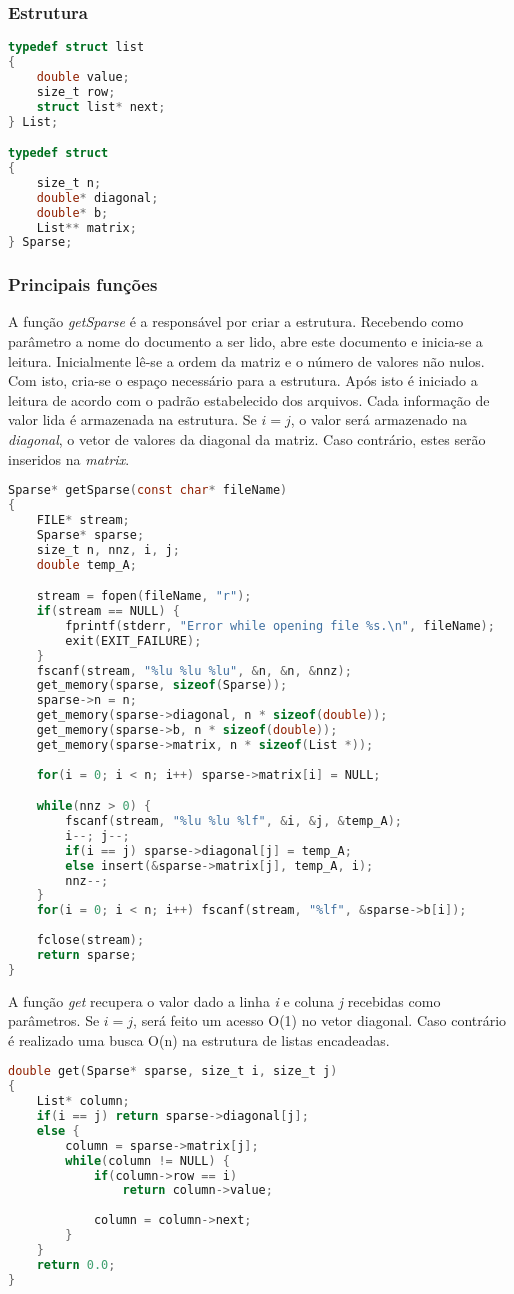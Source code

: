 \documentclass[
	article,			%
	11pt,				%
	oneside,			%
	a4paper,			%
	english,			%
	brazil,				%
	sumario=tradicional
	]{abntex2}
\begin{document}
\subsubsection{Estrutura}
\begin{lstlisting}[language=C, caption=Estrutura da Sparse]
typedef struct list
{
	double value;
	size_t row;
	struct list* next;
} List;

typedef struct
{
	size_t n;
	double* diagonal;
	double* b;
	List** matrix;
} Sparse;
\end{lstlisting}

\subsubsection{Principais funções}
A função \textit{getSparse} é a responsável por criar a estrutura. Recebendo como parâmetro a nome do documento a ser lido, abre este documento e inicia-se a leitura. Inicialmente lê-se a ordem da matriz e o número de valores não nulos. Com isto, cria-se o espaço necessário para a estrutura. Após isto é iniciado a leitura de acordo com o padrão estabelecido dos arquivos. Cada informação de valor lida é armazenada na estrutura. Se $ i = j $, o valor será armazenado na \textit{diagonal}, o vetor de valores da diagonal da matriz. Caso contrário, estes serão inseridos na \textit{matrix}.
\begin{lstlisting}[language=C, caption=Função gerar Sparse]
Sparse* getSparse(const char* fileName)
{
	FILE* stream;
	Sparse* sparse;
	size_t n, nnz, i, j;
	double temp_A;

	stream = fopen(fileName, "r");
	if(stream == NULL) {
		fprintf(stderr, "Error while opening file %s.\n", fileName);
		exit(EXIT_FAILURE);
	}
	fscanf(stream, "%lu %lu %lu", &n, &n, &nnz);
	get_memory(sparse, sizeof(Sparse));
	sparse->n = n;
	get_memory(sparse->diagonal, n * sizeof(double));
	get_memory(sparse->b, n * sizeof(double));
	get_memory(sparse->matrix, n * sizeof(List *));
	
	for(i = 0; i < n; i++) sparse->matrix[i] = NULL;

	while(nnz > 0) {
		fscanf(stream, "%lu %lu %lf", &i, &j, &temp_A);
		i--; j--;
		if(i == j) sparse->diagonal[j] = temp_A;
		else insert(&sparse->matrix[j], temp_A, i);
		nnz--;
	}
	for(i = 0; i < n; i++) fscanf(stream, "%lf", &sparse->b[i]);
		
	fclose(stream);
	return sparse;
}
\end{lstlisting}

A função \textit{get} recupera o valor dado a linha \textit{i} e coluna \textit{j} recebidas como parâmetros. Se $ i = j $, será feito um acesso O(1) no vetor diagonal. Caso contrário é realizado uma busca O(n) na estrutura de listas encadeadas.
\begin{lstlisting}[language=C, caption=Função recuperar valor]
double get(Sparse* sparse, size_t i, size_t j)
{
	List* column;
	if(i == j) return sparse->diagonal[j];
	else {
		column = sparse->matrix[j];
		while(column != NULL) {
			if(column->row == i)
				return column->value;
				
			column = column->next;
		}
	}
	return 0.0;
}
\end{lstlisting}
\end{document}
